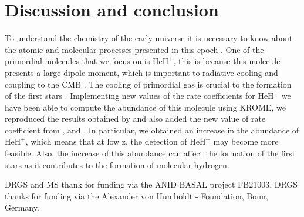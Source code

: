 \documentclass[baaa]{baaa}
\begin{document}
\section{Discussion and conclusion}
To understand the chemistry of the early universe it is necessary to know about the atomic and molecular processes presented in this epoch \citet{Bovino2011}. One of the primordial molecules that we focus on is $\mathrm{HeH^+}$, this is because this molecule presents a large dipole moment, which is important to radiative cooling and coupling to the CMB \citet{Novotny2019}. The cooling of primordial gas is crucial to the formation of the first stars \citet{Coppola2011}. 
Implementing new values of the rate coefficients for $\mathrm{HeH^+}$ we have been able to compute the abundance of this molecule using \textsc{KROME}, we reproduced the results obtained by \citet{Schleicher2008} and also added the new value of rate coefficient from \citet{Bovino2011}, \citet{Coppola2017} and \citet{Novotny2019}. In particular, we obtained an increase in the abundance of $\mathrm{HeH^+}$, which means that at low z, the detection of $\mathrm{HeH^+}$ may become more feasible. Also, the increase of this abundance can affect the formation of the first stars as it contributes to the formation of molecular hydrogen. 






\begin{acknowledgement}

{DRGS and MS thank for funding via the ANID BASAL project FB21003. DRGS thanks for funding via the  Alexander von Humboldt - Foundation, Bonn, Germany.}
\end{acknowledgement}

\small

\newpage
    
\end{document}
